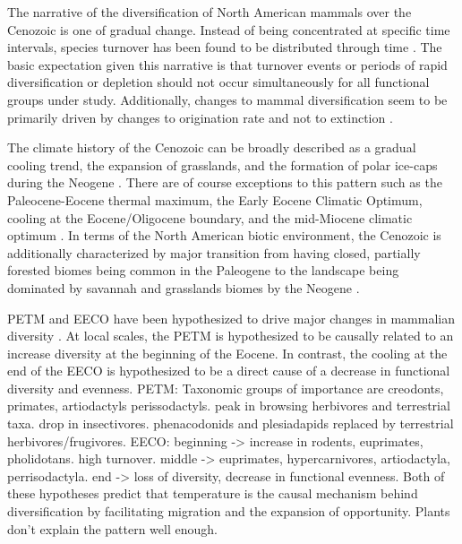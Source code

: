 \documentclass[12pt,letterpaper]{article}
\begin{document}
The narrative of the diversification of North American mammals over the Cenozoic is one of gradual change. Instead of being concentrated at specific time intervals, species turnover has been found to be distributed through time \citep{Alroy2009,Alroy1996a,Eronen2015,Janis1993b,Alroy2000g}. The basic expectation given this narrative is that turnover events or periods of rapid diversification or depletion should not occur simultaneously for all functional groups under study. Additionally, changes to mammal diversification seem to be primarily driven by changes to origination rate and not to extinction \citep{Alroy1996a,Alroy2000g,Alroy2009}. %

The climate history of the Cenozoic can be broadly described as a gradual cooling trend, the expansion of grasslands, and the formation of polar ice-caps during the Neogene \citep{Zachos2001,Zachos2008,Cramer2011}. There are of course exceptions to this pattern such as the Paleocene-Eocene thermal maximum, the Early Eocene Climatic Optimum, cooling at the Eocene/Oligocene boundary, and the mid-Miocene climatic optimum \citep{Zachos2001,Zachos2008}. In terms of the North American biotic environment, the Cenozoic is additionally characterized by major transition from having closed, partially forested biomes being common in the Paleogene to the landscape being dominated by savannah and grasslands biomes by the Neogene \citep{Blois2009,Janis1993b,Janis2000,Stromberg2005}. 

 PETM and EECO have been hypothesized to drive major changes in mammalian diversity \citep{Clyde1998a,Woodburne2009}. At local scales, the PETM is hypothesized to be causally related to an increase diversity at the beginning of the Eocene. In contrast, the cooling at the end of the EECO is hypothesized to be a direct cause of a decrease in functional diversity and evenness. PETM: Taxonomic groups of importance are creodonts, primates, artiodactyls perissodactyls. peak in browsing herbivores and terrestrial taxa. drop in insectivores. phenacodonids and plesiadapids replaced by terrestrial herbivores/frugivores. EECO: beginning -> increase in rodents, euprimates, pholidotans. high turnover. middle -> euprimates, hypercarnivores, artiodactyla, perrisodactyla. end -> loss of diversity, decrease in functional evenness. Both of these hypotheses predict that temperature is the causal mechanism behind diversification by facilitating migration and the expansion of opportunity. Plants don't explain the pattern well enough.
\end{document}
